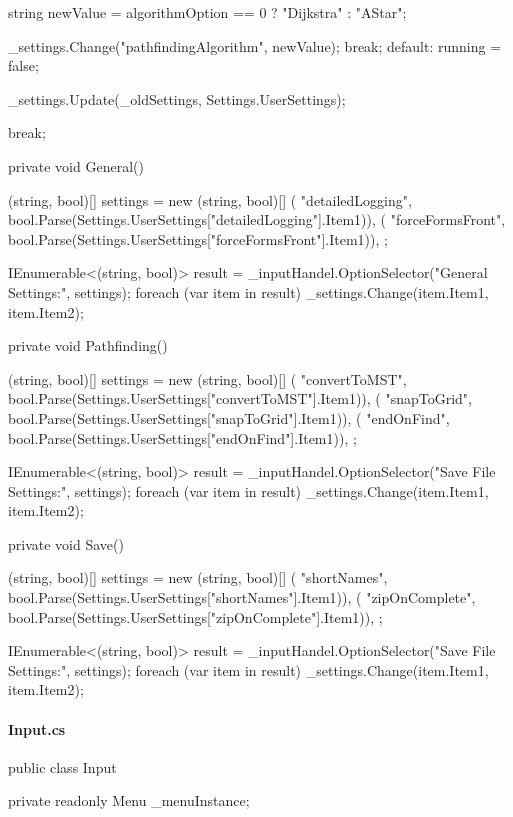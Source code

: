 \begin{flushleft}
\begin{cscode}
{{{{                    string newValue = algorithmOption == 0 ? "Dijkstra" : "AStar";

                    _settings.Change("pathfindingAlgorithm", newValue);
                    break;
                default:
                    running = false;

                    _settings.Update(_oldSettings, Settings.UserSettings);

                    break;

            }
        }
    }

    private void General()
    {
        (string, bool)[] settings = new (string, bool)[] {
            ( "detailedLogging", bool.Parse(Settings.UserSettings["detailedLogging"].Item1)),
            ( "forceFormsFront", bool.Parse(Settings.UserSettings["forceFormsFront"].Item1)),
        };

        IEnumerable<(string, bool)> result = _inputHandel.OptionSelector("General Settings:", settings);
        foreach (var item in result) _settings.Change(item.Item1, item.Item2);
    }

    private void Pathfinding()
    {
        (string, bool)[] settings = new (string, bool)[] {
            ( "convertToMST", bool.Parse(Settings.UserSettings["convertToMST"].Item1)),
            ( "snapToGrid", bool.Parse(Settings.UserSettings["snapToGrid"].Item1)),
            ( "endOnFind", bool.Parse(Settings.UserSettings["endOnFind"].Item1)),
        };

        IEnumerable<(string, bool)> result = _inputHandel.OptionSelector("Save File Settings:", settings);
        foreach (var item in result) _settings.Change(item.Item1, item.Item2);
    }

    private void Save()
    {
        (string, bool)[] settings = new (string, bool)[] {
            ( "shortNames", bool.Parse(Settings.UserSettings["shortNames"].Item1)),
            ( "zipOnComplete", bool.Parse(Settings.UserSettings["zipOnComplete"].Item1)),
        };

        IEnumerable<(string, bool)> result = _inputHandel.OptionSelector("Save File Settings:", settings);
        foreach (var item in result) _settings.Change(item.Item1, item.Item2);
    }

}
    \end{cscode}
    
    
    \paragraph{Input.cs}
    \begin{cscode}
public class Input
{
    private readonly Menu _menuInstance;

}
\end{cscode}
\end{flushleft}
